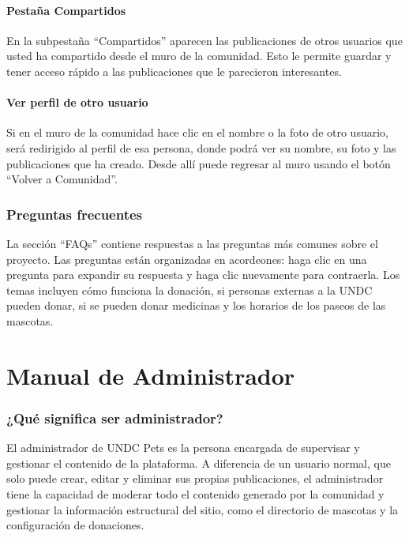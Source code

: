 \documentclass[12pt,a4paper]{article}
\begin{document}
\subsection{Pestaña Compartidos}

En la subpestaña ``Compartidos'' aparecen las publicaciones de otros usuarios que usted ha compartido desde el muro de la comunidad. Esto le permite guardar y tener acceso rápido a las publicaciones que le parecieron interesantes.

\subsection{Ver perfil de otro usuario}

Si en el muro de la comunidad hace clic en el nombre o la foto de otro usuario, será redirigido al perfil de esa persona, donde podrá ver su nombre, su foto y las publicaciones que ha creado. Desde allí puede regresar al muro usando el botón ``Volver a Comunidad''.

\section{Preguntas frecuentes}

La sección ``FAQs'' contiene respuestas a las preguntas más comunes sobre el proyecto. Las preguntas están organizadas en acordeones: haga clic en una pregunta para expandir su respuesta y haga clic nuevamente para contraerla. Los temas incluyen cómo funciona la donación, si personas externas a la UNDC pueden donar, si se pueden donar medicinas y los horarios de los paseos de las mascotas.

\newpage
\part{Manual de Administrador}

\section{¿Qué significa ser administrador?}

El administrador de UNDC Pets es la persona encargada de supervisar y gestionar el contenido de la plataforma. A diferencia de un usuario normal, que solo puede crear, editar y eliminar sus propias publicaciones, el administrador tiene la capacidad de moderar todo el contenido generado por la comunidad y gestionar la información estructural del sitio, como el directorio de mascotas y la configuración de donaciones.
\end{document}
